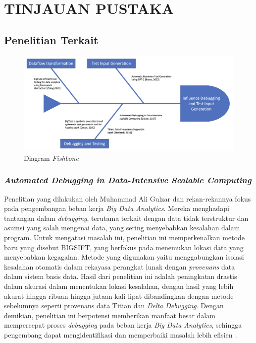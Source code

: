 \chapter{TINJAUAN PUSTAKA}
\label{chap:tinjauanpustaka}

\section{Penelitian Terkait}
\label{sec:penelitianterkait}

\begin{figure}[H]
  \centering

  \includegraphics[scale=0.17]{gambar/StateOfTheArt.jpg}

  \caption{Diagram \emph{Fishbone}}
  \label{fig:fishbone}
\end{figure}

\subsection{\emph{Automated Debugging in Data-Intensive Scalable Computing}}
\label{subsec:Automated Debugging in Data-Intensive Scalable Computing}

Penelitian yang dilakukan oleh Muhammad Ali Gulzar dan rekan-rekannya fokus pada pengembangan beban kerja \emph{Big Data Analytics}. Mereka menghadapi tantangan dalam \emph{debugging}, terutama terkait dengan data tidak terstruktur dan asumsi yang salah mengenai data, yang sering menyebabkan kesalahan dalam program. Untuk mengatasi masalah ini, penelitian ini memperkenalkan metode baru yang disebut BIGSIFT, yang berfokus pada menemukan lokasi data yang menyebabkan kegagalan. Metode yang digunakan yaitu menggabungkan isolasi kesalahan otomatis dalam rekayasa perangkat lunak dengan \emph{provenans} data dalam sistem basis data. Hasil dari penelitian ini adalah peningkatan drastis dalam akurasi dalam menentukan lokasi kesalahan, dengan hasil yang lebih akurat hingga ribuan hingga jutaan kali lipat dibandingkan dengan metode sebelumnya seperti provenans data Titian dan \emph{Delta Debugging}. Dengan demikian, penelitian ini berpotensi memberikan manfaat besar dalam mempercepat proses \emph{debugging} pada beban kerja \emph{Big Data Analytics}, sehingga pengembang dapat mengidentifikasi dan memperbaiki masalah lebih efisien~\cite{gulzar2017}.

